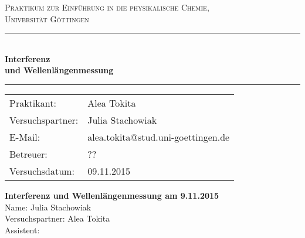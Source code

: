 \documentclass[12pt,a4paper,titlepage,headinclude,bibtotoc]{scrartcl}
\begin{document}
\begin{titlepage}
\centering
\textsc{\Large Praktikum zur Einführung in die physikalische Chemie,\\[1.5ex] Universität Göttingen}

\vspace*{3cm}

\rule{\textwidth}{1pt}\\[0.5cm]
{\huge \bfseries
  Interferenz\\[1.5ex]
  und Wellenlängenmessung}\\[0.5cm]
\rule{\textwidth}{1pt}

\vspace*{3cm}

\begin{Large}
\begin{tabular}{ll}
Praktikant: &  Alea Tokita\\
Versuchspartner: &  Julia Stachowiak\\
 E-Mail: & alea.tokita@stud.uni-goettingen.de\\
 Betreuer: & ??\\
 Versuchsdatum: & 09.11.2015\\
\end{tabular}
\end{Large}

\vspace*{0.8cm}

\begin{Large}
\end{Large}

\end{titlepage}

\newpage


\textbf{Interferenz und Wellenlängenmessung am 9.11.2015} \\

Name: Julia Stachowiak \\
Versuchspartner: Alea Tokita \\
Assistent: \\ \\
\end{document}

